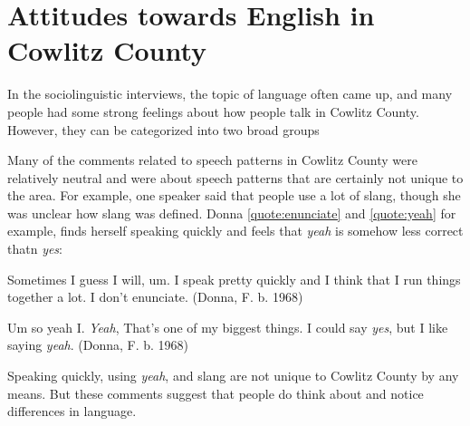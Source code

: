 
\section{Attitudes towards English in Cowlitz County}

In the sociolinguistic interviews, the topic of language often came up, and many people had some strong feelings about how people talk in Cowlitz County. However, they can be categorized into two broad groups




Many of the comments related to speech patterns in Cowlitz County were relatively neutral and were about speech patterns that are certainly not unique to the area. For example, one speaker said that people use a lot of slang, though she was unclear how slang was defined. Donna \ref{quote:enunciate} and \ref{quote:yeah} for example, finds herself speaking quickly and feels that \textit{yeah} is somehow less correct thatn \textit{yes}:
\begin{num_quote}
    Sometimes I guess I will, um. I speak pretty quickly and I think that I run things together a lot. I don't enunciate. (Donna, F. b. 1968)
    \label{quote:enunciate}
\end{num_quote}
\begin{num_quote}
    Um so yeah I. \textit{Yeah}, That's one of my biggest things. I could say \textit{yes}, but I like saying \textit{yeah}. (Donna, F. b. 1968)
    \label{quote:yeah}
\end{num_quote}
Speaking quickly, using \textit{yeah}, and slang are not unique to Cowlitz County by any means. But these comments suggest that people do think about and notice differences in language.


